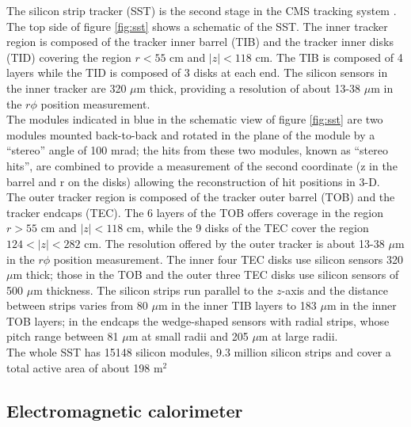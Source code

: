 \noindent The silicon strip tracker (SST) is the second stage in the CMS tracking system . The top side of figure \ref{fig:sst} shows a schematic of the SST. The inner tracker region is composed of the tracker inner barrel (TIB) and the tracker inner disks (TID) covering the region $r<55$ cm and $|z|<118$ cm. The TIB is composed of 4 layers while the TID is composed of 3 disks at each end. The silicon sensors in the inner tracker are 320 $\mu$m thick, providing a resolution of about 13-38 $\mu$m in the $r\phi$ position measurement. \\

\noindent The modules indicated in blue in the schematic view of figure \ref{fig:sst} are two modules mounted back-to-back and rotated in the plane of the module by a ``stereo'' angle of 100 mrad; the hits from these two modules, known as ``stereo hits'', are combined to provide a measurement of the second coordinate (z in the barrel and r on the disks) allowing the reconstruction of hit positions in 3-D.\\ 

\noindent The outer tracker region is composed of the tracker outer barrel (TOB) and the tracker endcaps (TEC). The 6 layers of the TOB offers coverage in the region $r>55$ cm and $|z|<118$ cm, while the 9 disks of the TEC cover the region $124<|z|<282$ cm. The resolution offered by the outer tracker is about 13-38 $\mu$m in the $r\phi$ position measurement. The inner four TEC disks use silicon sensors 320 $\mu$m thick; those in the TOB and the outer three TEC disks use silicon sensors of 500 $\mu$m thickness. The silicon strips run parallel to the $z$-axis and the distance between strips varies from 80 $\mu$m in the inner TIB layers to 183 $\mu$m in the inner TOB layers; in the endcaps the wedge-shaped sensors with radial strips, whose pitch range between 81 $\mu$m at small radii and 205 $\mu$m at large radii.\\ 

\noindent The whole SST has 15148 silicon modules, 9.3 million silicon strips and cover a total active area of about 198 m$^2$ 

\subsection{Electromagnetic calorimeter}


